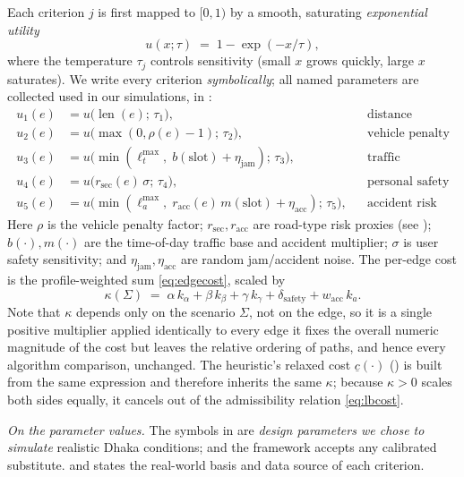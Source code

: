 \documentclass{ai-lab-report}
\begin{document}
Each criterion $j$ is first mapped to $[0,1)$ by a smooth, saturating \emph{exponential utility}
\begin{equation}
u(x;\tau)\;=\;1-\exp\!\left(-x/\tau\right),
\label{eq:exputil}
\end{equation}
where the temperature $\tau_j$ controls sensitivity (small $x$ grows quickly, large $x$ saturates). We write every criterion 
\emph{symbolically}; all named parameters are collected used in our simulations, in :
\begin{align}
u_1(e) &= u\!\big(\operatorname{len}(e);\,\tau_1\big), && \text{distance} \label{eq:u1}\\
u_2(e) &= u\!\big(\max(0,\rho(e)-1);\,\tau_2\big), && \text{vehicle penalty} \label{eq:u2}\\
u_3(e) &= u\!\big(\min(\ell^{\max}_{t},\; b(\mathrm{slot})+\eta_{\mathrm{jam}});\,\tau_3\big), && \text{traffic} \label{eq:u3}\\
u_4(e) &= u\!\big(r_{\mathrm{sec}}(e)\,\sigma;\,\tau_4\big), && \text{personal safety} \label{eq:u4}\\
u_5(e) &= u\!\big(\min(\ell^{\max}_{a},\; r_{\mathrm{acc}}(e)\,m(\mathrm{slot})+\eta_{\mathrm{acc}});\,\tau_5\big), && \text{accident risk} \label{eq:u5}
\end{align}
Here $\rho$ is the vehicle penalty factor; $r_{\mathrm{sec}},r_{\mathrm{acc}}$ are road-type risk proxies (see ); $b(\cdot),m(\cdot)$ are the time-of-day traffic base and accident multiplier; $\sigma$ is user safety sensitivity; and $\eta_{\mathrm{jam}},\eta_{\mathrm{acc}}$ are random jam/accident noise. The per-edge cost is the profile-weighted sum \cref{eq:edgecost}, scaled by
\begin{equation}
\kappa(\Sigma)\;=\;\alpha\,k_\alpha+\beta\,k_\beta+\gamma\,k_\gamma+\delta_{\mathrm{safety}}+w_{\mathrm{acc}}\,k_a .
\label{eq:kappa}
\end{equation}
Note that $\kappa$ depends only on the scenario $\Sigma$, not on the edge, so it is a single positive multiplier applied identically to every edge it fixes the overall numeric magnitude of the cost but leaves the relative ordering of paths, and hence every algorithm comparison, unchanged. The heuristic's relaxed cost $\underline{c}(\cdot)$ () is built from the same expression and therefore inherits the same $\kappa$; because $\kappa>0$ scales both sides equally, it cancels out of the admissibility relation \cref{eq:lbcost}.

\emph{On the parameter values.} The symbols in  are \emph{design parameters we chose to simulate} realistic Dhaka conditions;
and the framework accepts any calibrated substitute.  and  states the real-world basis and data source of each criterion.
\end{document}
